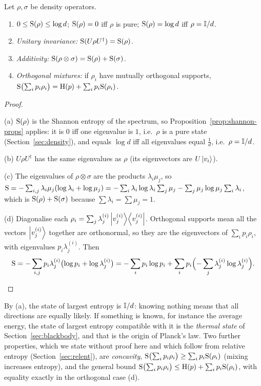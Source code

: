 \begin{proposition}\label{prop:vn-props}
  Let $\rho,\sigma$ be density operators.
  \begin{enumerate}
    \item[(a)] $0\le\mathrm{S}(\rho)\le\log d$; $\mathrm{S}(\rho)=0$ iff $\rho$ is pure; $\mathrm{S}(\rho)=\log d$ iff $\rho=\mathbb{I}/d$.
    \item[(b)] \emph{Unitary invariance:} $\mathrm{S}(U\rho U^\dagger)=\mathrm{S}(\rho)$.
    \item[(c)] \emph{Additivity:} $\mathrm{S}(\rho\otimes\sigma)=\mathrm{S}(\rho)+\mathrm{S}(\sigma)$.
    \item[(d)] \emph{Orthogonal mixtures:} if $\rho_i$ have mutually orthogonal supports, $\mathrm{S}\bigl(\sum_ip_i\rho_i\bigr)=\mathrm{H}(p)+\sum_ip_i\mathrm{S}(\rho_i)$.
  \end{enumerate}
\end{proposition}
\begin{proof}
  \begin{steps}
    \item (a) $\mathrm{S}(\rho)$ is the Shannon entropy of the spectrum, so Proposition~\ref{prop:shannon-props} applies: it is $0$ iff one eigenvalue is $1$, i.e.\ $\rho$ is a pure state (Section~\ref{sec:density}), and equals $\log d$ iff all eigenvalues equal $\tfrac1d$, i.e.\ $\rho=\mathbb{I}/d$.
    \item (b) $U\rho U^\dagger$ has the same eigenvalues as $\rho$ (its eigenvectors are $U\left|v_i\right\rangle$).
    \item (c) The eigenvalues of $\rho\otimes\sigma$ are the products $\lambda_i\mu_j$, so $\mathrm{S}=-\sum_{i,j}\lambda_i\mu_j(\log\lambda_i+\log\mu_j)=-\sum_i\lambda_i\log\lambda_i\sum_j\mu_j-\sum_j\mu_j\log\mu_j\sum_i\lambda_i$, which is $\mathrm{S}(\rho)+\mathrm{S}(\sigma)$ because $\sum\lambda_i=\sum\mu_j=1$.
    \item (d) Diagonalise each $\rho_i=\sum_j\lambda^{(i)}_j\left|v^{(i)}_j\right\rangle\!\left\langle v^{(i)}_j\right|$. Orthogonal supports mean all the vectors $\left|v^{(i)}_j\right\rangle$ together are orthonormal, so they are the eigenvectors of $\sum_ip_i\rho_i$, with eigenvalues $p_i\lambda^{(i)}_j$. Then
      \[
        \mathrm{S}=-\sum_{i,j}p_i\lambda^{(i)}_j\bigl(\log p_i+\log\lambda^{(i)}_j\bigr)=-\sum_ip_i\log p_i+\sum_ip_i\Bigl(-\sum_j\lambda^{(i)}_j\log\lambda^{(i)}_j\Bigr). 
      \]
  \end{steps}
\end{proof}

By (a), the state of largest entropy is $\mathbb{I}/d$: knowing nothing means that all directions are equally likely. If something is known, for instance the average energy, the state of largest entropy compatible with it is the \emph{thermal state} of Section~\ref{sec:blackbody}, and that is the origin of Planck's law.
Two further properties, which we state without proof here and which follow from relative entropy (Section~\ref{sec:relent}), are \emph{concavity}, $\mathrm{S}\bigl(\sum_ip_i\rho_i\bigr)\ge\sum_ip_i\mathrm{S}(\rho_i)$ (mixing increases entropy), and the general bound $\mathrm{S}\bigl(\sum_ip_i\rho_i\bigr)\le\mathrm{H}(p)+\sum_ip_i\mathrm{S}(\rho_i)$, with equality exactly in the orthogonal case (d).

